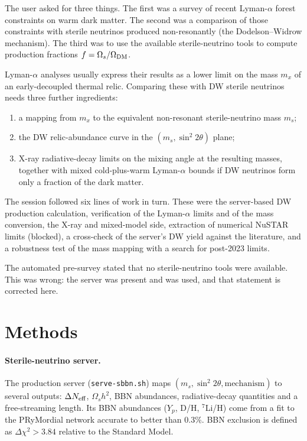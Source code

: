 \documentclass[11pt,a4paper]{article}
\begin{document}
The user asked for three things. The first was a survey of recent Lyman-$\alpha$ forest constraints on warm dark matter. The second was a comparison of those constraints with sterile neutrinos produced non-resonantly (the Dodelson--Widrow mechanism). The third was to use the available sterile-neutrino tools to compute production fractions $f=\Omega_s/\Omega_{\rm DM}$.

Lyman-$\alpha$ analyses usually express their results as a lower limit on the mass $m_x$ of an early-decoupled thermal relic. Comparing these with DW sterile neutrinos needs three further ingredients:
\begin{enumerate}
\item a mapping from $m_x$ to the equivalent non-resonant sterile-neutrino mass $m_s$;
\item the DW relic-abundance curve in the $(m_s,\sin^2 2\theta)$ plane;
\item X-ray radiative-decay limits on the mixing angle at the resulting masses, together with mixed cold-plus-warm Lyman-$\alpha$ bounds if DW neutrinos form only a fraction of the dark matter.
\end{enumerate}

The session followed six lines of work in turn. These were the server-based DW production calculation, verification of the Lyman-$\alpha$ limits and of the mass conversion, the X-ray and mixed-model side, extraction of numerical NuSTAR limits (blocked), a cross-check of the server's DW yield against the literature, and a robustness test of the mass mapping with a search for post-2023 limits.

The automated pre-survey stated that no sterile-neutrino tools were available. This was wrong: the server was present and was used, and that statement is corrected here.

\section{Methods}

\paragraph{Sterile-neutrino server.} The production server (\texttt{serve-sbbn.sh}) maps $(m_s,\sin^2 2\theta,\text{mechanism})$ to several outputs: $\Delta N_{\rm eff}$, $\Omega_s h^2$, BBN abundances, radiative-decay quantities and a free-streaming length. Its BBN abundances ($Y_p$, D/H, $^7$Li/H) come from a fit to the PRyMordial network accurate to better than 0.3\%. BBN exclusion is defined as $\Delta\chi^2>3.84$ relative to the Standard Model.
\end{document}
